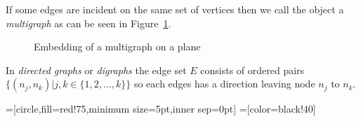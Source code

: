 If some edges are incident on the same set of vertices then we call the object a \textit{multigraph} as can be seen in 
Figure~\ref{fig:multi}.

\begin{figure}[h]
  \caption{Embedding of a multigraph on a plane}
  \label{fig:multi}
\end{figure}

In \textit{directed graphs} or \textit{digraphs} the edge set $ E $ consists of ordered pairs $ \{(n_j, n_k) | j,k \in \{1, 2, ..., k\}\} $ 
so each edges has a direction leaving node $ n_j $ to $ n_k $.

=[circle,fill=red!75,minimum size=5pt,inner sep=0pt]
=[color=black!40]

